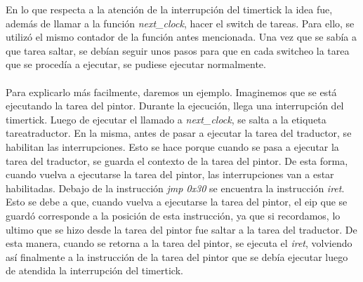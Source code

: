 En lo que respecta a la atenci\'on de la interrupci\'on del timertick la idea fue, adem\'as de llamar a la funci\'on \textit{next\_clock}, hacer el switch de tareas. Para ello, se utiliz\'o el mismo contador de la funci\'on antes mencionada. Una vez que se sab\'ia a que tarea saltar, se deb\'ian seguir unos pasos para que en cada switcheo la tarea que se proced\'ia a ejecutar, se pudiese ejecutar normalmente.
\paragraph{}
Para explicarlo m\'as facilmente, daremos un ejemplo. Imaginemos que se est\'a ejecutando la tarea del pintor. Durante la ejecuci\'on, llega una interrupci\'on del timertick. Luego de ejecutar el llamado a \textit{next\_clock}, se salta a la etiqueta tareatraductor. En la misma, antes de pasar a ejecutar la tarea del traductor, se habilitan las interrupciones. Esto se hace porque cuando se pasa a ejecutar la tarea del traductor, se guarda el contexto de la tarea del pintor. De esta forma, cuando vuelva a ejecutarse la tarea del pintor, las interrupciones van a estar habilitadas. Debajo de la instrucci\'on \textit{jmp 0x30} se encuentra la instrucci\'on \textit{iret}. Esto se debe a que, cuando vuelva a ejecutarse la tarea del pintor, el eip que se guard\'o corresponde a la posici\'on de esta instrucci\'on, ya que si recordamos, lo ultimo que se hizo desde la tarea del pintor fue saltar a la tarea del traductor. De esta manera, cuando se retorna a la tarea del pintor, se ejecuta el \textit{iret}, volviendo as\'i finalmente a la instrucci\'on de la tarea del pintor que se deb\'ia ejecutar luego de atendida la interrupci\'on del timertick.